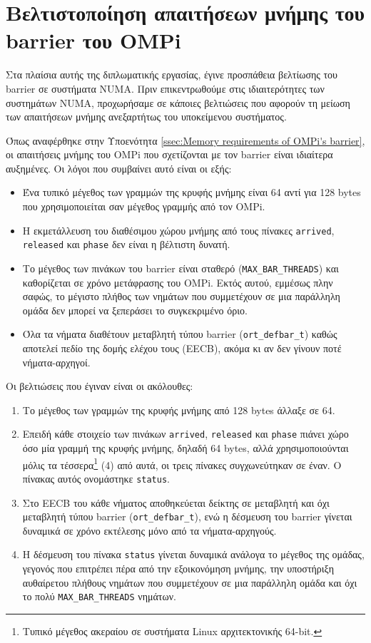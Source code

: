 \section{Βελτιστοποίηση απαιτήσεων μνήμης του barrier του OMPi}
Στα πλαίσια αυτής της διπλωματικής εργασίας, έγινε προσπάθεια βελτίωσης του barrier σε συστήματα NUMA. Πριν επικεντρωθούμε στις ιδιαιτερότητες των συστημάτων NUMA, προχωρήσαμε σε κάποιες βελτιώσεις που αφορούν τη μείωση των απαιτήσεων μνήμης ανεξαρτήτως του υποκείμενου συστήματος.

Όπως αναφέρθηκε στην Υποενότητα \ref{ssec:Memory requirements of OMPi's barrier}, οι απαιτήσεις μνήμης του OMPi που σχετίζονται με τον barrier είναι ιδιαίτερα αυξημένες. Οι λόγοι που συμβαίνει αυτό είναι οι εξής:
\begin{itemize}
	\item Ένα τυπικό μέγεθος των γραμμών της κρυφής μνήμης είναι 64 αντί για 128 bytes που χρησιμοποιείται σαν μέγεθος γραμμής από τον OMPi.
	\item Η εκμετάλλευση του διαθέσιμου χώρου μνήμης από τους πίνακες \texttt{arrived}, \texttt{released} και \texttt{phase} δεν είναι η βέλτιστη δυνατή.
	\item Το μέγεθος των πινάκων του barrier είναι σταθερό (\texttt{MAX\_BAR\_THREADS}) και καθορίζεται σε χρόνο μετάφρασης του OMPi. Εκτός αυτού, εμμέσως πλην σαφώς, το μέγιστο πλήθος των νημάτων που συμμετέχουν σε μια παράλληλη ομάδα δεν μπορεί να ξεπεράσει το συγκεκριμένο όριο.
	\item Όλα τα νήματα διαθέτουν μεταβλητή τύπου barrier (\texttt{ort\_defbar\_t}) καθώς αποτελεί πεδίο της δομής ελέχου τους (EECB), ακόμα κι αν δεν γίνουν ποτέ νήματα-αρχηγοί.
\end{itemize}

\noindent Οι βελτιώσεις που έγιναν είναι οι ακόλουθες:
\begin{enumerate}
	\item Το μέγεθος των γραμμών της κρυφής μνήμης από 128 bytes άλλαξε σε 64.
	\item Επειδή κάθε στοιχείο των πινάκων \texttt{arrived}, \texttt{released} και \texttt{phase} πιάνει χώρο όσο μία γραμμή της κρυφής μνήμης, δηλαδή 64 bytes, αλλά χρησιμοποιούνται μόλις τα τέσσερα\footnote{Τυπικό μέγεθος ακεραίου σε συστήματα Linux αρχιτεκτονικής 64-bit.} (4) από αυτά, οι τρεις πίνακες συγχωνεύτηκαν σε έναν. Ο πίνακας αυτός ονομάστηκε \texttt{status}.
	\item Στο EECB του κάθε νήματος αποθηκεύεται δείκτης σε μεταβλητή και όχι μεταβλητή τύπου barrier (\texttt{ort\_defbar\_t}), ενώ η δέσμευση του barrier γίνεται δυναμικά σε χρόνο εκτέλεσης μόνο από τα νήματα-αρχηγούς.
	\item Η δέσμευση του πίνακα \texttt{status} γίνεται δυναμικά ανάλογα το μέγεθος της ομάδας, γεγονός που επιτρέπει πέρα από την εξοικονόμηση μνήμης, την υποστήριξη αυθαίρετου πλήθους νημάτων που συμμετέχουν σε μια παράλληλη ομάδα και όχι το πολύ \texttt{MAX\_BAR\_THREADS} νημάτων.
\end{enumerate}

